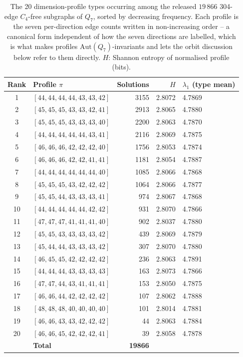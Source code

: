 \documentclass[12pt]{article}
\begin{document}
\begin{table}[ht]
\centering\small
\caption{The 20 dimension-profile types occurring among the released
  $19\,866$ 304-edge $C_4$-free subgraphs of $Q_7$, sorted by decreasing
  frequency. Each profile is the seven
  per-direction edge counts written in non-increasing order -- a canonical
  form independent of how the seven directions are labelled, which is what
  makes profiles $\mathrm{Aut}(Q_7)$-invariants and lets the orbit
  discussion below refer to them directly.
  $H$: Shannon entropy of normalised profile (bits).}
\label{tab:types}\medskip
\begin{tabular}{clrrl}
\toprule
Rank & Profile $\pi$ & Solutions & $H$ & $\lambda_1$ (type mean)\\
\midrule
 1 & $[44,44,44,44,43,43,42]$ & 3155 & 2.8072 & 4.7869\\
 2 & $[45,45,45,43,43,42,41]$ & 2913 & 2.8065 & 4.7880\\
 3 & $[45,45,45,43,43,43,40]$ & 2200 & 2.8063 & 4.7870\\
 4 & $[44,44,44,44,44,43,41]$ & 2116 & 2.8069 & 4.7875\\
 5 & $[46,46,46,42,42,42,40]$ & 1756 & 2.8053 & 4.7874\\
 6 & $[46,46,46,42,42,41,41]$ & 1181 & 2.8054 & 4.7887\\
 7 & $[44,44,44,44,44,44,40]$ & 1085 & 2.8066 & 4.7868\\
 8 & $[45,45,45,43,42,42,42]$ & 1064 & 2.8066 & 4.7877\\
 9 & $[45,45,44,43,43,43,41]$ &  974 & 2.8067 & 4.7868\\
10 & $[44,44,44,44,44,42,42]$ &  931 & 2.8070 & 4.7866\\
11 & $[47,47,47,41,41,41,40]$ &  902 & 2.8037 & 4.7880\\
12 & $[45,45,43,43,43,43,42]$ &  439 & 2.8069 & 4.7879\\
13 & $[45,44,44,43,43,43,42]$ &  307 & 2.8070 & 4.7880\\
14 & $[46,45,45,42,42,42,42]$ &  236 & 2.8063 & 4.7891\\
15 & $[44,44,44,43,43,43,43]$ &  163 & 2.8073 & 4.7866\\
16 & $[47,47,44,43,41,41,41]$ &  153 & 2.8050 & 4.7875\\
17 & $[46,46,44,42,42,42,42]$ &  107 & 2.8062 & 4.7888\\
18 & $[48,48,48,40,40,40,40]$ &  101 & 2.8014 & 4.7881\\
19 & $[46,46,43,43,42,42,42]$ &   44 & 2.8063 & 4.7884\\
20 & $[46,46,45,42,42,42,41]$ &   39 & 2.8058 & 4.7878\\
\midrule
   & \textbf{Total}           & \textbf{19866}\\
\bottomrule
\end{tabular}
\end{table}
\end{document}
